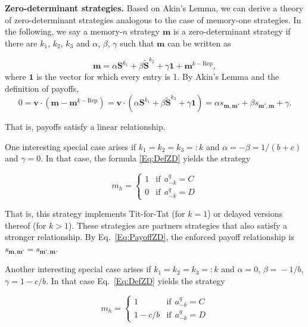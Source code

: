 \documentclass{article}
\theoremstyle{definition}
\begin{document}
\noindent
{\bf Zero-determinant strategies.}
Based on Akin's Lemma, we can derive a theory of zero-determinant strategies
analogous to the case of memory-one strategies. In the following, we say a
memory-$n$ strategy $\mathbf{m}$ is a zero-determinant strategy if there are
$k_1$, $k_2$, $k_3$ and $\alpha$, $\beta$, $\gamma$ such that $\mathbf{m}$ can
be written as

\begin{equation} \label{Eq:DefZD}
\mathbf{m} = \alpha \mathbf{S}^{k_1} + \beta \mathbf{\tilde{S}}^{k_2} + \gamma \mathbf{1} + \mathbf{m}^{k-\text{Rep}},  
\end{equation} 
where $\mathbf{1}$ is the vector for which every entry is 1. By Akin's Lemma and the definition of payoffs,
\begin{equation} \label{Eq:PayoffZD}
0 = \mathbf{v} \cdot  (\mathbf{m} - \mathbf{m}^{k-\text{Rep}}) = \mathbf{v} \cdot (\alpha \mathbf{S}^{k_1} + \beta \mathbf{\tilde{S}}^{k_2} + \gamma \mathbf{1} ) = \alpha s_{\mathbf{m}, \mathbf{m'}} + \beta s_{\mathbf{m'}, \mathbf{m}} + \gamma. 
\end{equation}

That is, payoffs satisfy a linear relationship. 

One interesting special case arises if $k_1\!=\!k_2\!=\!k_3\!=:\!k$ and $\alpha
= -\beta =1/(b\!+\!c)$ and $\gamma=0$. In that case, the formula
\eqref{Eq:DefZD} yields the strategy

\begin{equation}
m_h = \left\{
\begin{array}{ll}
1	&\text{if}~~a^q_{-k}=C\\
0	&\text{if}~~a^q_{-k}=D
\end{array}
\right.
\end{equation}

That is, this strategy implements Tit-for-Tat (for $k\!=\!1$) or delayed
versions thereof (for $k\!>\!1$). These strategies are partners strategies that
also satisfy a stronger relationship. By Eq.~\eqref{Eq:PayoffZD}, the enforced
payoff relationship is $s_{\mathbf{m}, \mathbf{m'}}\!=\! s_{\mathbf{m'},
\mathbf{m}}$.

Another interesting special case arises if  $k_1\!=\!k_2\!=\!k_3\!=:\!k$ and
$\alpha\!=\!0$, $\beta\!=\!-1/b$, $\gamma\!=\!1\!-\!c/b$. In that case
Eq.~\eqref{Eq:DefZD} yields the strategy

\begin{equation}
m_h = \left\{
\begin{array}{ll}
1	&\text{if}~~a^q_{-k}=C\\
1-c/b	&\text{if}~~a^q_{-k}=D
\end{array}
\right.
\end{equation}
\end{document}
